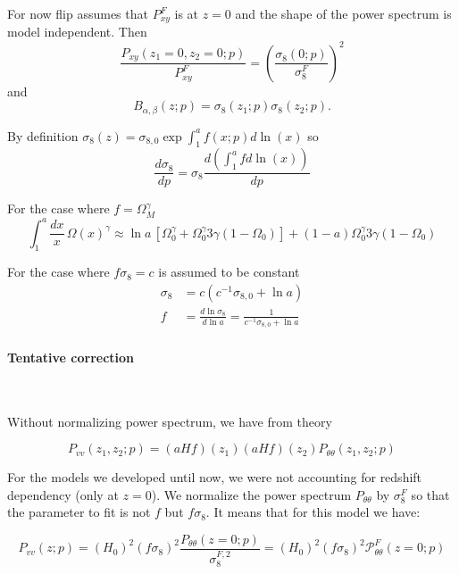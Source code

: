 \documentclass{article}
\begin{document}
For now flip assumes that $P^F_{xy}$ is at $z=0$ and the shape of the power spectrum is model independent.  Then
\begin{equation}
    \frac{P_{xy}(z_1=0, z_2=0;p)} 
 {P^F_{xy}} = \left(\frac{\sigma_8(0; p)}{\sigma^F_{8}} \right)^2
\end{equation}
and
\begin{equation}
    B_{\alpha,\beta}(z;p) = \sigma_8(z_1; p)
    \sigma_8(z_2; p). 
\end{equation}


By definition
$\sigma_8(z) = \sigma_{8,0} \exp{\int_1^a f(x;p) d\ln(x)}$ so
\begin{equation}
    \frac{d \sigma_8}{dp} = \sigma_8 \frac{d
    \left(\int_1^a f d\ln(x)\right)} {dp}
\end{equation}

For the case where $f=\Omega_M^\gamma$
\begin{equation}
 \int^a_1 \frac{dx}{x}\,\Omega(x)^\gamma \approx \ln a \,\left[\Omega_0^\gamma + \Omega_0^\gamma 3\gamma(1-\Omega_0)\right] + (1-a) \Omega_0^\gamma 3\gamma(1-\Omega_0)
\end{equation}

For the case where $f\sigma_8=c$
is assumed to be constant
\begin{align}
\sigma_8 & = c \left( c^{-1}\sigma_{8,0} + \ln{a}\right) \\
f & = \frac{d\ln{\sigma_8}}{d\ln{a}}  = \frac{1}{  c^{-1}\sigma_{8,0} + \ln{a}}
\end{align}


\paragraph{Tentative correction}
\


Without normalizing power spectrum, we have from theory

\begin{equation}
       P_{vv}(z_1,z_2;p) = (aHf)(z_1)(aHf)(z_2) P_{\theta\theta}(z_1, z_2;p) 
\end{equation}

For the models we developed until now, we were not accounting for redshift dependency (only at $z=0$). We normalize the power spectrum $P_{\theta\theta}$ by $\sigma_8^F$ so that the parameter to fit is not $f$ but $f\sigma_8$. It means that for this model we have:

\begin{equation}
       P_{vv}(z;p) = (H_0)^2 (f\sigma_8)^2 \frac{P_{\theta\theta}(z=0;p)}{\sigma_8^{F, 2}} = (H_0)^2 (f\sigma_8)^2  \mathcal{P}^F_{\theta\theta}(z=0;p)
\end{equation}
\end{document}
